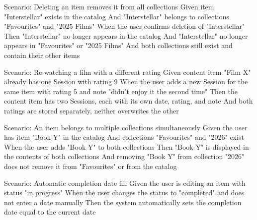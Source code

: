 \begin{codelisting}
\caption{Deleting an Item with Cascade Removal}
\label{lst:bdd-delete}
\begin{skedcode}
Scenario: Deleting an item removes it from all collections
  Given item "Interstellar" exists in the catalog
  And "Interstellar" belongs to collections "Favourites" and "2025 Films"
  When the user confirms deletion of "Interstellar"
  Then "Interstellar" no longer appears in the catalog
  And "Interstellar" no longer appears in "Favourites" or "2025 Films"
  And both collections still exist and contain their other items
\end{skedcode}
\end{codelisting}

\begin{codelisting}
\caption{Repeated Viewing with a Different Rating}
\label{lst:bdd-session}
\begin{skedcode}
Scenario: Re-watching a film with a different rating
  Given content item "Film X" already has one Session with rating 9
  When the user adds a new Session for the same item
    with rating 5 and note "didn't enjoy it the second time"
  Then the content item has two Sessions, each with its own date,
    rating, and note
  And both ratings are stored separately, neither overwrites the other
\end{skedcode}
\end{codelisting}

\begin{codelisting}
\caption{Item in Multiple Collections}
\label{lst:bdd-collection}
\begin{skedcode}
Scenario: An item belongs to multiple collections simultaneously
  Given the user has item "Book Y" in the catalog
  And collections "Favourites" and "2026" exist
  When the user adds "Book Y" to both collections
  Then "Book Y" is displayed in the contents of both collections
  And removing "Book Y" from collection "2026" does not remove it
    from "Favourites" or from the catalog
\end{skedcode}
\end{codelisting}

\begin{codelisting}
\caption{Automatic Completion Date Fill}
\label{lst:bdd-date}
\begin{skedcode}
Scenario: Automatic completion date fill
  Given the user is editing an item with status "in progress"
  When the user changes the status to "completed"
    and does not enter a date manually
  Then the system automatically sets the completion date
    equal to the current date
\end{skedcode}
\end{codelisting}

